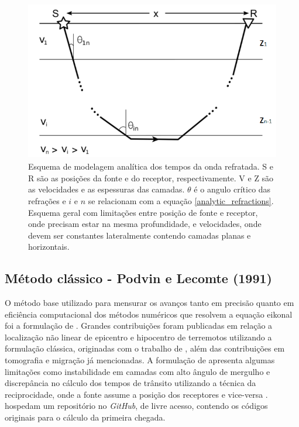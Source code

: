 \begin{figure}[H]
	\centering
	\includegraphics[width = 12cm, height = 7cm]{Imgs/RevisaoBibliografica/refracted_analytic.png}
	\caption{Esquema de modelagem analítica dos tempos da onda refratada. S e R são as posições da fonte e do receptor, respectivamente. V e Z são as velocidades e as espessuras das camadas. $\theta$ é o angulo crítico das refrações e $i$ e $n$ se relacionam com a equação \ref{analytic_refractions}. Esquema geral com limitações entre posição de fonte e receptor, onde precisam estar na mesma profundidade, e velocidades, onde devem ser constantes lateralmente contendo camadas planas e horizontais.}
	\label{fig:refracted_analytic}
\end{figure}

\subsection{Método clássico - Podvin e Lecomte (1991)}

O método base utilizado para mensurar os avanços tanto em precisão quanto em eficiência computacional dos métodos numéricos que resolvem a equação eikonal foi a formulação de . Grandes contribuições foram publicadas em relação a localização não linear de epicentro e hipocentro de terremotos utilizando a formulação clássica, originadas com o trabalho de  , além das contribuições em tomografia e migração já mencionadas. A formulação de  apresenta algumas limitações como instabilidade em camadas com alto ângulo de mergulho \cite{afnimar2000finite} e discrepância no cálculo dos tempos de trânsito utilizando a técnica da reciprocidade, onde a fonte assume a posição dos receptores e vice-versa \cite{tryggvason2006travel}.  hospedam um repositório no \textit{GitHub}, de livre acesso, contendo os códigos originais para o cálculo da primeira chegada.  


